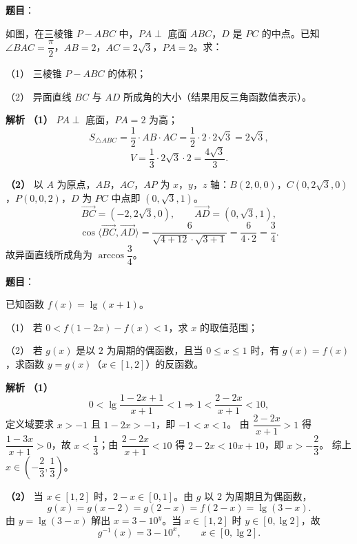 \begin{answer}

\textbf{题目}：

如图，在三棱锥 $P-ABC$ 中，$PA\perp$ 底面 $ABC$，$D$ 是 $PC$ 的中点。已知 $\angle BAC=\dfrac\pi2$，$AB=2$，$AC=2\sqrt3$，$PA=2$。求：

（1） 三棱锥 $P-ABC$ 的体积；

（2） 异面直线 $BC$ 与 $AD$ 所成角的大小（结果用反三角函数值表示）。
\nopagebreak[4]
\begin{center}\end{center}
\nopagebreak[4]
\textbf{解析}
\textbf{（1）} $PA\perp$ 底面，$PA=2$ 为高；
\nopagebreak[4]
\[S_{\triangle ABC}=\frac12\cdot AB\cdot AC=\frac12\cdot2\cdot2\sqrt3=2\sqrt3,\]
\nopagebreak[4]
\[V=\frac13\cdot2\sqrt3\cdot2=\frac{4\sqrt3}3.\]

\textbf{（2）} 以 $A$ 为原点，$AB$，$AC$，$AP$ 为 $x$，$y$，$z$ 轴：$B(2,0,0)$，$C(0,2\sqrt3,0)$，$P(0,0,2)$，$D$ 为 $PC$ 中点即 $(0,\sqrt3,1)$。
\nopagebreak[4]
\[\overrightarrow{BC}=(-2,2\sqrt3,0),\qquad\overrightarrow{AD}=(0,\sqrt3,1),\]
\nopagebreak[4]
\[\cos\langle\overrightarrow{BC},\overrightarrow{AD}\rangle=\frac{6}{\sqrt{4+12}\cdot\sqrt{3+1}}=\frac{6}{4\cdot2}=\frac34.\]
故异面直线所成角为 $\arccos\dfrac34$。



\end{answer}
\begin{answer}

\textbf{题目}：

已知函数 $f(x)=\lg(x+1)$。

（1） 若 $0<f(1-2x)-f(x)<1$，求 $x$ 的取值范围；

（2） 若 $g(x)$ 是以 $2$ 为周期的偶函数，且当 $0\leqslant x\leqslant1$ 时，有 $g(x)=f(x)$，求函数 $y=g(x)$（$x\in[1,2]$）的反函数。

\textbf{解析}
\textbf{（1）}
\nopagebreak[4]
\[0<\lg\frac{1-2x+1}{x+1}<1\Longrightarrow1<\frac{2-2x}{x+1}<10,\]
定义域要求 $x>-1$ 且 $1-2x>-1$，即 $-1<x<1$。
由 $\dfrac{2-2x}{x+1}>1$ 得 $\dfrac{1-3x}{x+1}>0$，故 $x<\dfrac13$；由 $\dfrac{2-2x}{x+1}<10$ 得 $2-2x<10x+10$，即 $x>-\dfrac23$。
综上 $x\in\left(-\dfrac23,\dfrac13\right)$。

\textbf{（2）} 当 $x\in[1,2]$ 时，$2-x\in[0,1]$。由 $g$ 以 $2$ 为周期且为偶函数，
\nopagebreak[4]
\[g(x)=g(x-2)=g(2-x)=f(2-x)=\lg(3-x).\]
由 $y=\lg(3-x)$ 解出 $x=3-10^y$。当 $x\in[1,2]$ 时 $y\in[0,\lg2]$，故
\nopagebreak[4]
\[g^{-1}(x)=3-10^x,\qquad x\in[0,\lg2].\]



\end{answer}
